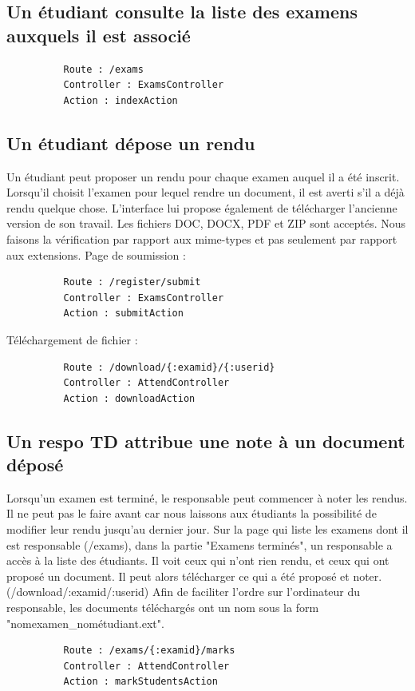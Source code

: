 \documentclass{report}
\begin{document}
     \subsection{Un étudiant consulte la liste des examens auxquels il est associé}
        \begin{verbatim}
          Route : /exams 
          Controller : ExamsController
          Action : indexAction
        \end{verbatim}

      \subsection{Un étudiant dépose un rendu}
        Un étudiant peut proposer un rendu pour chaque examen auquel il a été inscrit.
        Lorsqu'il choisit l'examen pour lequel rendre un document, il est averti s'il a
        déjà rendu quelque chose. L'interface lui propose également de télécharger l'ancienne
        version de son travail.
        Les fichiers DOC, DOCX, PDF et ZIP sont acceptés. Nous faisons
        la vérification par rapport aux mime-types et pas seulement par rapport aux extensions.
        Page de soumission :
        \begin{verbatim}
          Route : /register/submit
          Controller : ExamsController
          Action : submitAction
        \end{verbatim}
        Téléchargement de fichier :
        \begin{verbatim}
          Route : /download/{:examid}/{:userid}
          Controller : AttendController
          Action : downloadAction
        \end{verbatim}

      \subsection{Un respo TD attribue une note à un document déposé}
        Lorsqu'un examen est terminé, le responsable peut commencer à noter les rendus.
        Il ne peut pas le faire avant car nous laissons aux étudiants la possibilité
        de modifier leur rendu jusqu'au dernier jour.
        Sur la page qui liste les examens dont il est responsable
        (/exams), dans la partie "Examens terminés",
        un responsable a accès à la liste des étudiants. Il voit ceux qui
        n'ont rien rendu, et ceux qui ont proposé un document. Il peut alors
        télécharger ce qui a été proposé et noter.
        (/download/{:examid}/{:userid})
        Afin de faciliter l'ordre sur l'ordinateur du responsable, les documents
        téléchargés ont un nom sous la form "nomexamen\_nométudiant.ext".
        \begin{verbatim}
          Route : /exams/{:examid}/marks
          Controller : AttendController
          Action : markStudentsAction
        \end{verbatim}
\end{document}
